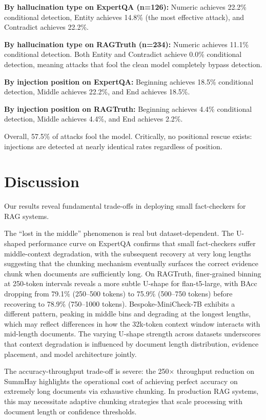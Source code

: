 \documentclass{article}
\begin{document}
\textbf{By hallucination type on ExpertQA (n=126):} Numeric achieves 22.2\% conditional detection, Entity achieves 14.8\% (the most effective attack), and Contradict achieves 22.2\%.

\textbf{By hallucination type on RAGTruth (n=234):} Numeric achieves 11.1\% conditional detection. Both Entity and Contradict achieve 0.0\% conditional detection, meaning attacks that fool the clean model completely bypass detection.

\textbf{By injection position on ExpertQA:} Beginning achieves 18.5\% conditional detection, Middle achieves 22.2\%, and End achieves 18.5\%.

\textbf{By injection position on RAGTruth:} Beginning achieves 4.4\% conditional detection, Middle achieves 4.4\%, and End achieves 2.2\%.

Overall, 57.5\% of attacks fool the model. Critically, no positional rescue exists: injections are detected at nearly identical rates regardless of position.

\section{Discussion}

Our results reveal fundamental trade-offs in deploying small fact-checkers for RAG systems.

The ``lost in the middle'' phenomenon is real but dataset-dependent. The U-shaped performance curve on ExpertQA confirms that small fact-checkers suffer middle-context degradation, with the subsequent recovery at very long lengths suggesting that the chunking mechanism eventually surfaces the correct evidence chunk when documents are sufficiently long. On RAGTruth, finer-grained binning at 250-token intervals reveals a more subtle U-shape for flan-t5-large, with BAcc dropping from 79.1\% (250--500 tokens) to 75.9\% (500--750 tokens) before recovering to 78.9\% (750--1000 tokens). Bespoke-MiniCheck-7B exhibits a different pattern, peaking in middle bins and degrading at the longest lengths, which may reflect differences in how the 32k-token context window interacts with mid-length documents. The varying U-shape strength across datasets underscores that context degradation is influenced by document length distribution, evidence placement, and model architecture jointly.

The accuracy-throughput trade-off is severe: the 250× throughput reduction on SummHay highlights the operational cost of achieving perfect accuracy on extremely long documents via exhaustive chunking. In production RAG systems, this may necessitate adaptive chunking strategies that scale processing with document length or confidence thresholds.
\end{document}
